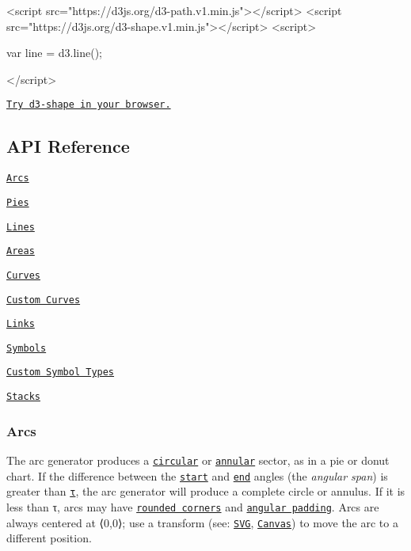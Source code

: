 \begin{DoxyCode}
<script src="https://d3js.org/d3-path.v1.min.js"></script>
<script src="https://d3js.org/d3-shape.v1.min.js"></script>
<script>

var line = d3.line();

</script>
\end{DoxyCode}


\href{https://tonicdev.com/npm/d3-shape}{\tt Try d3-\/shape in your browser.}

\subsection*{A\+PI Reference}


\begin{DoxyItemize}
\item \href{#arcs}{\tt Arcs}
\item \href{#pies}{\tt Pies}
\item \href{#lines}{\tt Lines}
\item \href{#areas}{\tt Areas}
\item \href{#curves}{\tt Curves}
\item \href{#custom-curves}{\tt Custom Curves}
\item \href{#links}{\tt Links}
\item \href{#symbols}{\tt Symbols}
\item \href{#custom-symbol-types}{\tt Custom Symbol Types}
\item \href{#stacks}{\tt Stacks}
\end{DoxyItemize}

\subsubsection*{Arcs}

\href{http://bl.ocks.org/mbostock/8878e7fd82034f1d63cf}{\tt }\href{http://bl.ocks.org/mbostock/2394b23da1994fc202e1}{\tt }

The arc generator produces a \href{https://en.wikipedia.org/wiki/Circular_sector}{\tt circular} or \href{https://en.wikipedia.org/wiki/Annulus_\(mathematics\)}{\tt annular} sector, as in a pie or donut chart. If the difference between the \href{#arc_startAngle}{\tt start} and \href{#arc_endAngle}{\tt end} angles (the {\itshape angular span}) is greater than \href{https://en.wikipedia.org/wiki/Turn_\(geometry\)#Tau_proposal}{\tt τ}, the arc generator will produce a complete circle or annulus. If it is less than τ, arcs may have \href{#arc_cornerRadius}{\tt rounded corners} and \href{#arc_padAngle}{\tt angular padding}. Arcs are always centered at ⟨0,0⟩; use a transform (see\+: \href{http://www.w3.org/TR/SVG/coords.html#TransformAttribute}{\tt S\+VG}, \href{http://www.w3.org/TR/2dcontext/#transformations}{\tt Canvas}) to move the arc to a different position.

